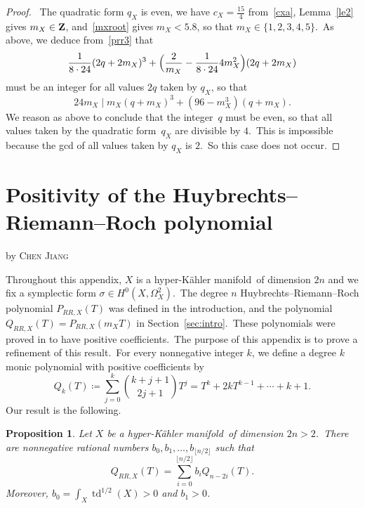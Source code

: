 \documentclass[12pt]{amsart}
\def\Z{{\bf Z}}
\DeclareMathOperator{\td}{td}
\def\hKm{hyper-K\"ahler manifold}
\newtheorem{prop}[lemm]{Proposition}
\theoremstyle{remark}
\def\lll{\ensuremath{\mathsf l}}
\def\mm{\ensuremath{\mathsf m}}
\begin{document}
\begin{proof}
\noindent{\bf{Assume  $ q_X(\lll,\mm)=2 $.}}\ The quadratic form $q_X$ is even, we have $c_X=\frac{15}4$ from~\eqref{cxa}, Lemma~\ref{le2} gives $m_X\in   \Z$, and~\eqref{mxroot} gives $m_X<5.8 $, so that $m_X \in\{1,2,3,4,5\}$.\  As above, we  deduce from~\eqref{prr3} that
 $$ \frac{1}{8\cdot 24}(2q+ 2m_X)^3+\Bigl(\frac{2}{m_X}-\frac{1}{8\cdot 24}4m_X^2\Bigr)(2q+ 2m_X) $$
 must be an integer for all values $2q$ taken by $q_X$, so that 
$$24 m_X\mid    m_X(q+m_X)^3+ (96- m_X^3 )(q+m_X).
$$
We reason as above to conclude that the integer~$q$ must be even,  so that all values taken by the quadratic form~$q_X$ are divisible by $4$.\ This is   impossible because   the gcd of all values taken  by $q_X$ is  $2$.\ So this case does not occur. 
 \end{proof}

 


\appendix

\section{Positivity of the Huybrechts--Riemann--Roch polynomial}\label{secapp}

\smallskip
\begin{center}by \textsc{Chen Jiang}\end{center}
\medskip

\newcommand\sigmabar{{\overline{\sigma}}}
\newcommand{\rounddown}[1]{\lfloor{#1}\rfloor}
\newcommand{\roundup}[1]{\lceil{#1}\rceil}
 

  Throughout this appendix, $X$ is a \hKm\ of dimension $2n$ and we fix a symplectic form $\sigma\in H^0(X, \Omega^2_X)$.\   The degree $n$  Huybrechts--Riemann--Roch polynomial  $P_{RR,X}(T)$ was defined in the introduction, and the polynomial $Q_{RR,X}(T)=P_{RR,X}(m_XT)$  in Section~\ref{sec:intro}.\ These polynomials were  proved in \cite[Theorem~1.1]{jia} to have positive coefficients.\ The purpose of this appendix is to prove a refinement of this result.\ For every nonnegative integer $k$, we define a degree $k$ monic polynomial with positive coefficients by
 $$Q_k(T)\coloneqq \sum_{j=0}^{k}\binom{k+j+1}{2j+1}T^j
 =T^k+2kT^{k-1}+\cdots + k+1
 .$$
  Our result is the following.
  
  \begin{prop}\label{propa1}
Let $X$ be a \hKm\ of dimension $2n>2$.\ There are nonnegative rational numbers $b_0, b_1, \dots, b_{\lfloor n/2\rfloor}$ 
such that
\begin{equation}\label{eq Q=sum Q}
Q_{RR, X}(T)=\sum_{i=0}^{\lfloor n/2\rfloor}b_iQ_{n-2i}(T).
\end{equation}
Moreover, $b_0=\int_X\td^{1/2}(X)>0$ and $b_1>0$. 
\end{prop}
\end{document}
